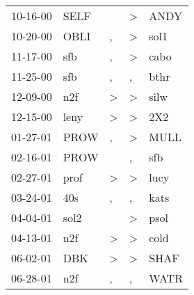 \begin{supertabular}{p{0.07\textwidth}p{0.06\textwidth}p{0.02\textwidth}p{0.02\textwidth}p{0.06\textwidth}}
          10-16-00\textsuperscript{} &           SELF\textsuperscript{} &                  &     \textgreater &           ANDY\textsuperscript{} \\
          10-20-00\textsuperscript{} &           OBLI\textsuperscript{} &                , &     \textgreater &           sol1\textsuperscript{} \\
          11-17-00\textsuperscript{} &            sfb\textsuperscript{} &                , &     \textgreater &           cabo\textsuperscript{} \\
          11-25-00\textsuperscript{} &            sfb\textsuperscript{} &                , &                , &           bthr\textsuperscript{} \\
          12-09-00\textsuperscript{} &            n2f\textsuperscript{} &     \textgreater &     \textgreater &           silw\textsuperscript{} \\
          12-15-00\textsuperscript{} &           leny\textsuperscript{} &     \textgreater &     \textgreater &            2X2\textsuperscript{} \\
          01-27-01\textsuperscript{} &           PROW\textsuperscript{} &                , &     \textgreater &           MULL\textsuperscript{} \\
          02-16-01\textsuperscript{} &           PROW\textsuperscript{} &                  &                , &            sfb\textsuperscript{} \\
          02-27-01\textsuperscript{} &           prof\textsuperscript{} &     \textgreater &     \textgreater &           lucy\textsuperscript{} \\
          03-24-01\textsuperscript{} &            40s\textsuperscript{} &                , &                , &           kats\textsuperscript{} \\
          04-04-01\textsuperscript{} &           sol2\textsuperscript{} &                  &     \textgreater &           psol\textsuperscript{} \\
          04-13-01\textsuperscript{} &            n2f\textsuperscript{} &     \textgreater &     \textgreater &           cold\textsuperscript{} \\
          06-02-01\textsuperscript{} &            DBK\textsuperscript{} &     \textgreater &     \textgreater &           SHAF\textsuperscript{} \\
          06-28-01\textsuperscript{} &            n2f\textsuperscript{} &                , &                , &           WATR\textsuperscript{} \\

\end{supertabular}
